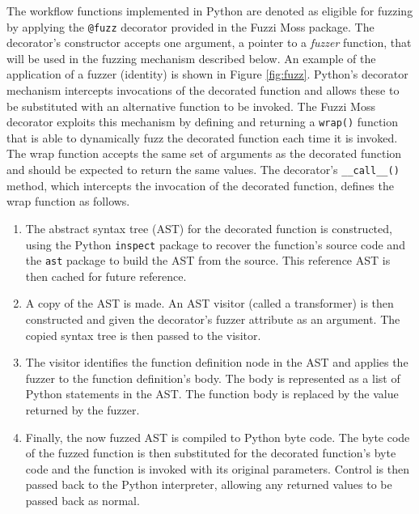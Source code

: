 \documentclass{sig-alternate}
\begin{document}
The workflow functions implemented in Python are denoted as eligible for fuzzing by applying the \lstinline!@fuzz!
decorator provided in the Fuzzi Moss package. The decorator's constructor accepts one argument, a pointer to a
\emph{fuzzer} function, that will be used in the fuzzing mechanism described below.  An example of the application of a
fuzzer (identity) is shown in Figure \ref{fig:fuzz}. Python's decorator mechanism intercepts invocations of the
decorated function and allows these to be substituted with an alternative function to be invoked.  The Fuzzi Moss
decorator exploits this mechanism by defining and returning a \lstinline!wrap()!  function that is able to dynamically
fuzz the decorated function each time it is invoked.  The wrap function accepts the same set of arguments as the
decorated function and should be expected to return the same values. The decorator's \lstinline!__call__()!  method,
which intercepts the invocation of the decorated function, defines the wrap function as follows.

\begin{enumerate}

\item The abstract syntax tree (AST) for the decorated function is constructed, using the Python \lstinline!inspect!
  package to recover the function's source code and the \lstinline!ast!  package to build the AST from the source.  This
  reference AST is then cached for future reference.

\item A copy of the AST is made.  An AST visitor (called a transformer) is then constructed and given the decorator's
  fuzzer attribute as an argument.  The copied syntax tree is then passed to the visitor.

\item The visitor identifies the function definition node in the AST and applies the fuzzer to the function definition's
  body.  The body is represented as a list of Python statements in the AST.  The function body is replaced by the value
  returned by the fuzzer.

\item Finally, the now fuzzed AST is compiled to Python byte code.  The byte code of the fuzzed function is then
  substituted for the decorated function's byte code and the function is invoked with its original parameters.  Control
  is then passed back to the Python interpreter, allowing any returned values to be passed back as normal.

\end{enumerate}
\end{document}
